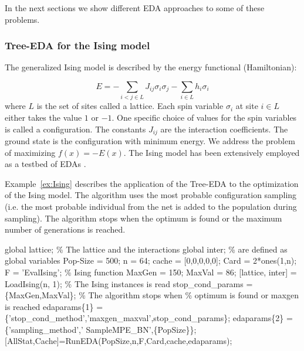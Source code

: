 \documentclass[a4paper]{article}
\begin{document}
In the next sections we show different EDA approaches to some of
these problems.


\subsubsection{Tree-EDA for the Ising model}


 The generalized Ising model \cite{Ising:1925} is described by the energy functional
(Hamiltonian):

 \begin{equation}
 E = - \sum_{i<j \in L} J_{ij} \sigma_i \sigma_j - \sum_{i \in L} h_{i}
 \sigma_i  \label{ISINGM}
 \end{equation}
where $L$ is the set of sites called a lattice. Each spin variable
$\sigma_i$ at site $i \in L$ either takes the value $1$ or $-1$. One
specific choice of values for the spin variables is called a
configuration. The constants $J_{ij}$ are the interaction
coefficients.  The ground state is the configuration with minimum
energy. We address the problem of maximizing $f(x) = -E(x)$. The
Ising model has been extensively employed as a testbed of EDAs
\cite{Brownlee_et_al:2008,Hoens_et_al:2007,Mendiburu_et_al:2007a,Muehlenbein_and_Hoens:2005,Pelikan_and_Hartmann:2006,Shakya_and_McCall:2007}.

Example~\ref{ex:Ising} describes the application of the Tree-EDA to
the optimization of the Ising model. The algorithm uses the most
probable configuration sampling \cite{Mendiburu_et_al:2007a}  (i.e.
  the most probable individual from the net is added to the population
  during sampling). The algorithm stops when the optimum is found or the
 maximum number of generations is reached.


\begin{example}

 \begin{programf}
 global lattice; \% The lattice and the interactions
 global inter;   \% are defined as global variables
 Pop-Size = 500;
 n = 64;
 cache  = [0,0,0,0,0];
 Card = 2*ones(1,n);
 F = 'EvalIsing';  \% Ising function
 MaxGen = 150;
 MaxVal = 86;
 [lattice, inter] = LoadIsing(n, 1);     \% The Ising instances is read
 stop\_cond\_params = \{MaxGen,MaxVal\}; \% The algorithm stops when
                                 \% optimum is found or maxgen is reached \UnnumLine  
 edaparams\{1\} = \{'stop\_cond\_method','maxgen\_maxval',stop\_cond\_params\};
 edaparams\{2\} = \{'sampling\_method',' SampleMPE\_BN',\{PopSize\}\};
 [AllStat,Cache]=RunEDA(PopSize,n,F,Card,cache,edaparams); \end{programf}

\label{ex:Ising} \end{example}
\end{document}
